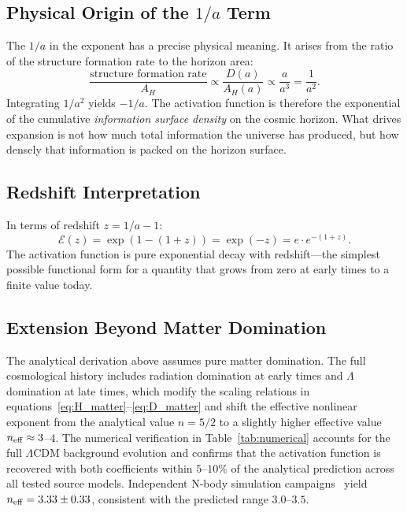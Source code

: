 \documentclass[twocolumn,a4paper,aps,prd,twocolumn,showpacs,notitlepage,superscriptaddress,nofootinbib]{article}
\newcommand{\LCDM}{$\Lambda$CDM}
\begin{document}
\subsection{Physical Origin of the $1/a$ Term}

The $1/a$ in the exponent has a precise physical meaning.  It arises from
the ratio of the structure formation rate to the horizon area:
\begin{equation}
\frac{\text{structure formation rate}}{A_H} \propto
\frac{D(a)}{A_H(a)} \propto \frac{a}{a^3} = \frac{1}{a^2}.
\end{equation}
Integrating $1/a^2$ yields $-1/a$.  The activation function is therefore
the exponential of the cumulative \textit{information surface density} on
the cosmic horizon.  What drives expansion is not how much total information
the universe has produced, but how densely that information is packed on the
horizon surface.

\subsection{Redshift Interpretation}

In terms of redshift $z = 1/a - 1$:
\begin{equation}
\mathcal{E}(z) = \exp(1 - (1+z)) = \exp(-z) = e\cdot e^{-(1+z)}.
\end{equation}
The activation function is pure exponential decay with redshift---the
simplest possible functional form for a quantity that grows from zero at
early times to a finite value today.

\subsection{Extension Beyond Matter Domination}

The analytical derivation above assumes pure matter domination.  The full
cosmological history includes radiation domination at early times and
$\Lambda$ domination at late times, which modify the scaling relations in
equations~\eqref{eq:H_matter}--\eqref{eq:D_matter} and shift the effective
nonlinear exponent from the analytical value $n = 5/2$ to a slightly higher
effective value $n_{\rm eff} \approx 3$--$4$.  The numerical verification in
Table~\ref{tab:numerical} accounts for the full \LCDM{} background evolution
and confirms that the activation function is recovered with both coefficients
within $5$--$10\%$ of the analytical prediction across all tested source models.
Independent N-body simulation campaigns~\citep{Jenkins2001,Tinker2008,Watson2013}
yield $n_{\rm eff} = 3.33 \pm 0.33$, consistent with the predicted range $3.0$--$3.5$.
\end{document}

